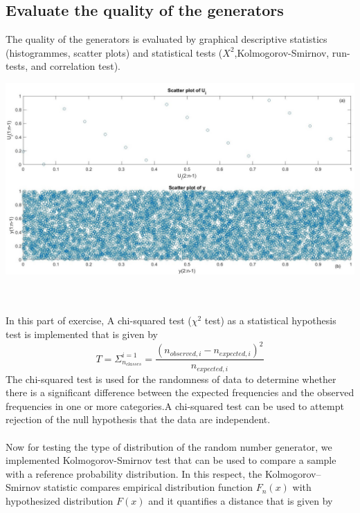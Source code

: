 \subsection{Evaluate the quality of the generators}
 The quality of the generators is evaluated  by graphical descriptive statistics (histogrammes, scatter plots) and statistical tests ($X^2$,Kolmogorov-Smirnov, run-tests, and correlation test).\\
 \begin{center}
    \includegraphics[scale=0.3]{Figures/figure1_2.jpg}\\
\end{center}\\
\\In this part of exercise, A chi-squared test ($\chi^2$ test) as a  statistical hypothesis test is implemented that is given by
\begin{equation}
  T=  \Sigma^{i=1}_{n_{classes}} =\frac{(n_{observed,i}-n_{expected,i})^2}{n_{expected,i}}
\end{equation}
The chi-squared test is used for the randomness of data to determine whether there is a significant difference between the expected frequencies and the observed frequencies in one or more categories.A chi-squared test can be used to attempt rejection of the null hypothesis that the data are independent.\\
%
\\Now for testing the type of distribution of the random number generator, we implemented Kolmogorov-Smirnov test that can be used to compare a sample with a reference probability distribution. In this respect, the Kolmogorov–Smirnov statistic compares empirical distribution function $F_{n}(x)$  with hypothesized distribution $F(x)$ and it quantifies a distance that is given by
